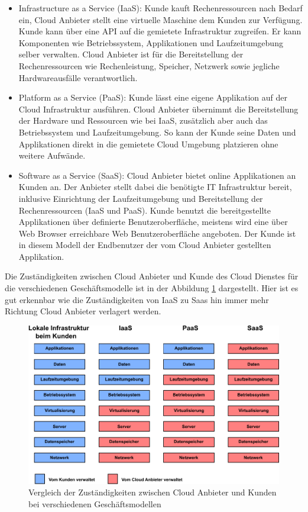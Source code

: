 \begin{itemize}
	\item Infrastructure as a Service (IaaS): Kunde kauft Rechenressourcen nach Bedarf ein, Cloud Anbieter stellt eine \gls{virtuelle Maschine} dem Kunden zur Verfügung. Kunde kann über eine API auf die gemietete Infrastruktur zugreifen. Er kann Komponenten wie Betriebssystem, Applikationen und Laufzeitumgebung selber verwalten. Cloud Anbieter ist für die Bereitstellung der Rechenressourcen wie Rechenleistung, Speicher, Netzwerk sowie jegliche Hardwareausfälle verantwortlich.
	\item Platform as a Service (PaaS): Kunde lässt eine eigene Applikation auf der Cloud Infrastruktur ausführen. Cloud Anbieter übernimmt die Bereitstellung der Hardware und Ressourcen wie bei IaaS, zusätzlich aber auch das Betriebssystem und Laufzeitumgebung. So kann der Kunde seine Daten und Applikationen direkt in die gemietete Cloud Umgebung platzieren ohne weitere Aufwände.
	\item Software as a Service (SaaS): Cloud Anbieter bietet online Applikationen an Kunden an. Der Anbieter stellt dabei die benötigte IT Infrastruktur bereit, inklusive Einrichtung der Laufzeitumgebung und Bereitstellung der Rechenressourcen (IaaS und PaaS). Kunde benutzt die bereitgestellte Applikationen über definierte Benutzeroberfläche, meistens wird eine über Web Browser erreichbare Web Benutzeroberfläche angeboten. Der Kunde ist in diesem Modell der Endbenutzer der vom Cloud Anbieter gestellten Applikation.

\end{itemize} \cite{Mell2011}

Die Zuständigkeiten zwischen Cloud Anbieter und Kunde des Cloud Dienstes für die verschiedenen Geschäftsmodelle ist in der Abbildung \ref{cloud_modelle} dargestellt. Hier ist es gut erkennbar wie die Zuständigkeiten von IaaS zu Saas hin immer mehr Richtung Cloud Anbieter verlagert werden.

\begin{figure}
	\centering
	\includegraphics[width=\textwidth]{./content/graphics/cloud_models.pdf}
	\caption{Vergleich der Zuständigkeiten zwischen Cloud Anbieter und Kunden bei verschiedenen Geschäftsmodellen}
	\label{cloud_modelle}
\end{figure}

